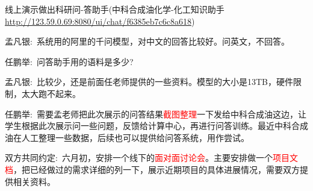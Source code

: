 线上演示做出科研问-答助手(中科合成油化学-化工知识助手 \url{http://123.59.0.69:8080/ui/chat/f6385eb7c6c8a618})

{孟凡银}:~系统用的阿里的千问模型，对中文的回答比较好。问英文，不回答。

{任鹏举}:~问答助手用的语料是多少?

{孟凡银}:~比较少，还是前面任老师提供的一些资料。模型的大小是\textrm{13TB}，硬件限制，太大跑不起来。

{任鹏举}:~需要孟老师把此次展示的问答结果\textcolor{red}{截图整理}一下发给中科合成油这边，让学生根据此次展示问一些问题，反馈给计算中心，再进行问答训练。最近中科合成油在人工整理一些数据，后续也可以提供给问答系统，用作尝试。

{双方共同约定}:~六月初，安排一个线下的\textcolor{red}{面对面讨论会}。主要安排做一个\textcolor{red}{项目文档}，把已经做过的需求详细的列一下，展示近期项目的具体进展情况，需要双方提供相关资料。
